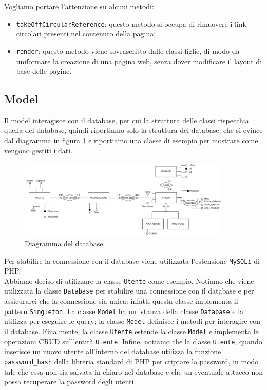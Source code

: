 Vogliamo portare l'attenzione su alcuni metodi:
\begin{itemize}
	\item \texttt{takeOffCircularReference}: questo metodo si occupa di
	      rimuovere i link circolari presenti nel contenuto della pagina;

	\item \texttt{render}: questo metodo viene sovrascritto dalle classi figlie,
	      di modo da uniformare la creazione di una pagina web, senza dover
	      modificare il layout di base delle pagine.
\end{itemize}

\subsection{Model}

Il model interagisce con il database, per cui la struttura delle classi
rispecchia quella del database, quindi riportiamo solo la struttura del
database, che si evince dal diagramma in figura \ref{fig:Database} e riportiamo
una classe di esempio per mostrare come vengono gestiti i dati.

\begin{figure}[h]
	\centering
	\includegraphics[width=0.9\textwidth]{figures/Database}
	\caption{Diagramma del database.}
	\label{fig:Database}
\end{figure}

Per stabilire la connessione con il database viene utilizzata l'estensione
\texttt{MySQLi} di PHP.\\
Abbiamo deciso di utilizzare la classe \texttt{Utente} come esempio. Notiamo che
viene utilizzata la classe \texttt{Database} per stabilire una connessione con
il database e per assicurarci che la connessione sia unica: infatti questa
classe implementa il pattern \texttt{Singleton}. La classe \texttt{Model} ha un
istanza della classe \texttt{Database} e la utilizza per eseguire le query; la
classe \texttt{Model} definisce i metodi per interagire con il database.
Finalmente, la classe \texttt{Utente} estende la classe \texttt{Model} e
implementa le operazioni CRUD sull'entità \texttt{Utente}.
Infine, notiamo che la classe \texttt{Utente}, quando inserisce un nuovo utente
all'interno del database utilizza la funzione \texttt{password\_hash} della
libreria standard di PHP per criptare la password, in modo tale che essa non sia
salvata in chiaro nel database e che un eventuale attacco non possa recuperare
la password degli utenti.

